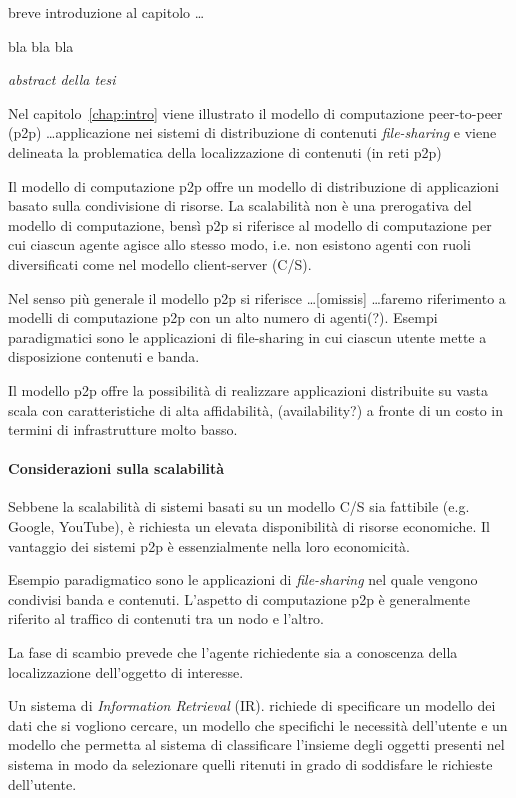 breve introduzione al capitolo \ldots

bla bla bla

\textit{abstract della tesi}

Nel capitolo~\ref{chap:intro} viene illustrato il modello di computazione peer-to-peer (p2p) \ldots applicazione nei sistemi di distribuzione di contenuti \textit{file-sharing} e viene delineata la problematica della localizzazione di contenuti (in reti p2p)

Il modello di computazione p2p offre un modello di distribuzione di applicazioni basato sulla condivisione di risorse. La scalabilità non è una prerogativa del modello di computazione, bensì p2p si riferisce al modello di computazione per cui ciascun agente agisce allo stesso modo, i.e. non esistono agenti con ruoli diversificati come nel modello client-server (C/S).

Nel senso più generale il modello p2p si riferisce \ldots [omissis] \ldots faremo riferimento a modelli di computazione p2p con un alto numero di agenti(?). Esempi paradigmatici sono le applicazioni di file-sharing in cui ciascun utente mette a disposizione contenuti e banda.

Il modello p2p offre la possibilità di realizzare applicazioni distribuite su vasta scala con caratteristiche di alta affidabilità, (availability?) a fronte di un costo in termini di infrastrutture molto basso. 

\paragraph{Considerazioni sulla scalabilità} Sebbene la scalabilità di sistemi basati su un modello C/S sia fattibile (e.g. Google, YouTube), è richiesta un elevata disponibilità di risorse economiche. Il vantaggio dei sistemi p2p è essenzialmente nella loro economicità.

Esempio paradigmatico sono le applicazioni di \textit{file-sharing} nel quale vengono condivisi banda e contenuti. L'aspetto di computazione p2p è generalmente riferito al traffico di contenuti tra un nodo e l'altro.

La fase di scambio prevede che l'agente richiedente sia a conoscenza della localizzazione dell'oggetto di interesse.

Un sistema di \textit{Information Retrieval} (IR). richiede di specificare un modello dei dati che si vogliono cercare, un modello che specifichi le necessità dell'utente e un modello che permetta al sistema di classificare l'insieme degli oggetti presenti nel sistema in modo da selezionare quelli ritenuti in grado di soddisfare le richieste dell'utente.

